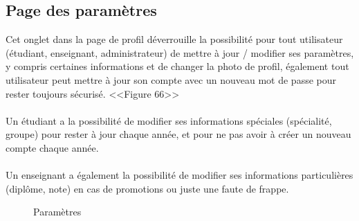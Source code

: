 \documentclass[12pt]{report}
\begin{document}
\newpage

\subsection{Page des paramètres}
\vspace{0.2in}

Cet onglet dans la page de profil déverrouille la possibilité pour tout utilisateur (étudiant, enseignant, administrateur) de mettre à jour / modifier ses paramètres, y compris certaines informations et de changer la photo de profil, également tout utilisateur peut mettre à jour son compte avec un nouveau mot de passe pour rester toujours sécurisé. <<Figure 66>>
\\\\
Un étudiant a la possibilité de modifier ses informations spéciales (spécialité, groupe) pour rester à jour chaque année, et pour ne pas avoir à créer un nouveau compte chaque année.
\\\\
Un enseignant a également la possibilité de modifier ses informations particulières (diplôme, note) en cas de promotions ou juste une faute de frappe.

\vspace{0.6in}

\begin{figure}[h]
\centering
\caption{Paramètres}
\end{figure}
\end{document}
